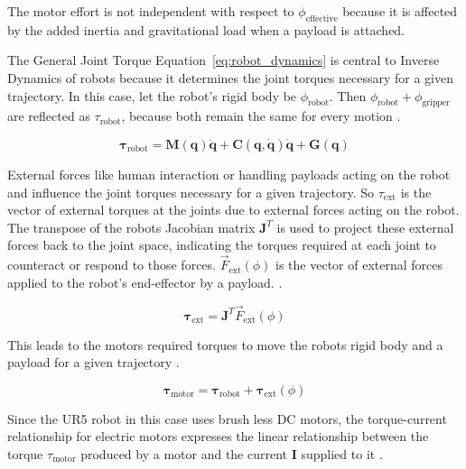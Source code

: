     The motor effort is not independent with respect to \(\phi_{\text{effective}}\) because it is affected by the added inertia and gravitational load when a payload is attached.
    
    The General Joint Torque Equation~\eqref{eq:robot_dynamics} is central to Inverse Dynamics of robots because it determines the joint torques necessary for a given trajectory. In this case, let the robot's rigid body be \(\phi_{\text{robot}}\). Then \(\phi_{\text{robot}} + \phi_{\text{gripper}}\) are reflected as \(\tau_{\text{robot}}\), because both remain the same for every motion \cite{Popov2019}.
    
    \begin{equation}
    \boldsymbol{\tau}_{\text{robot}} = \mathbf{M}(\boldsymbol{q}) \ddot{\boldsymbol{q}} + \mathbf{C}(\boldsymbol{q}, \dot{\boldsymbol{q}}) \dot{\boldsymbol{q}} + \mathbf{G}(\boldsymbol{q})
    \label{eq:robot_dynamics}
    \end{equation}

    External forces like human interaction or handling payloads acting on the robot and influence the joint torques necessary for a given trajectory. So \(\tau_{\text{ext}}\) is the vector of external torques at the joints due to external forces acting on the robot. The transpose of the robots Jacobian matrix \(\mathbf{J}^T\) is used to project these external forces back to the joint space, indicating the torques required at each joint to counteract or respond to those forces. \(\vec{F}_{\text{ext}}(\phi)\) is the vector of external forces applied to the robot's end-effector by a payload. \cite{Popov2019, lu2023external}. 

    \begin{equation}
    \boldsymbol{\tau}_{\text{ext}} = \mathbf{J}^T \vec{F}_{\text{ext}}(\phi)
    \label{eq:tau_ext}
    \end{equation}

    This leads to the motors required torques to move the robots rigid body and a payload for a given trajectory \cite{liu2021sensorless}.
    
    \begin{equation}
    \boldsymbol{\tau}_{\text{motor}} = \boldsymbol{\tau}_{\text{robot}} + \boldsymbol{\tau}_{\text{ext}}(\phi)
    \label{eq:tau_motor}
    \end{equation}

    Since the UR5 robot in this case uses brush less DC motors, the torque-current relationship for electric motors  expresses the linear relationship between the torque \(\tau_{\text{motor}}\) produced by a motor and the current \(\mathbf{I}\) supplied to it \cite{deng2021dynamic,ctms_motor_speed}.
    
